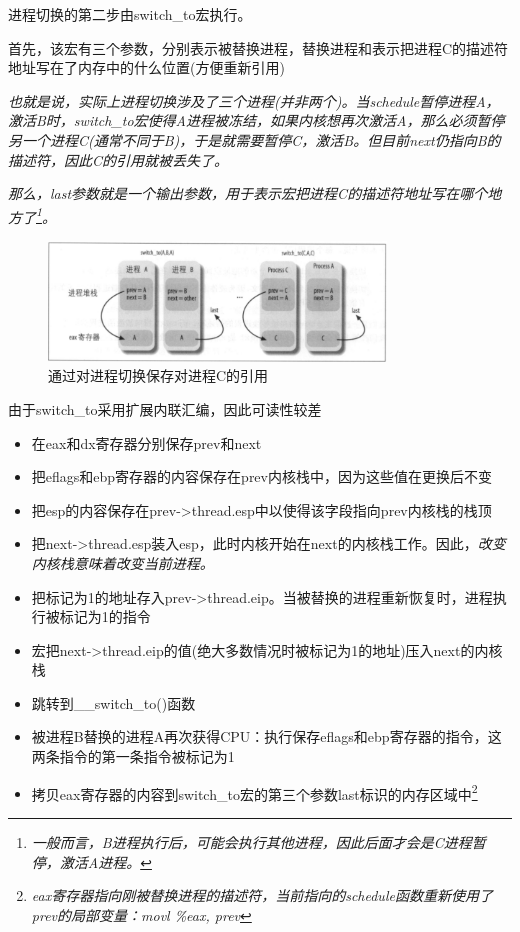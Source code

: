     进程切换的第二步由switch\_to宏执行。

    首先，该宏有三个参数，分别表示被替换进程，替换进程和表示把进程C的描述符地址写在了内存中的什么位置(方便重新引用)

    \emph{也就是说，实际上进程切换涉及了三个进程(并非两个)。当schedule暂停进程A，激活B时，switch\_to宏使得A进程被冻结，如果内核想再次激活A，那么必须暂停另一个进程C(通常不同于B)，于是就需要暂停C，激活B。但目前next仍指向B的描述符，因此C的引用就被丢失了。}

    \emph{那么，last参数就是一个输出参数，用于表示宏把进程C的描述符地址写在哪个地方了\footnote[1]{\emph{一般而言，B进程执行后，可能会执行其他进程，因此后面才会是C进程暂停，激活A进程。}}。}

\begin{figure}[!htbp]
    \centering
    \includegraphics[width=0.8\textwidth]{image/chapter03/通过对进程切换保存对进程C的引用.png}
    \caption{通过对进程切换保存对进程C的引用}
\end{figure}

    由于switch\_to采用扩展内联汇编，因此可读性较差

\begin{itemize}
    \item [1)] 在eax和dx寄存器分别保存prev和next
    \item [2)] 把eflags和ebp寄存器的内容保存在prev内核栈中，因为这些值在更换后不变
    \item [3)] 把esp的内容保存在prev->thread.esp中以使得该字段指向prev内核栈的栈顶
    \item [4)] 把next->thread.esp装入esp，此时内核开始在next的内核栈工作。因此，\emph{改变内核栈意味着改变当前进程。}
    \item [5)] 把标记为1的地址存入prev->thread.eip。当被替换的进程重新恢复时，进程执行被标记为1的指令
    \item [6)] 宏把next->thread.eip的值(绝大多数情况时被标记为1的地址)压入next的内核栈
    \item [7)] 跳转到\_\_switch\_to()函数
    \item [8)] 被进程B替换的进程A再次获得CPU：执行保存eflags和ebp寄存器的指令，这两条指令的第一条指令被标记为1
    \item [9)] 拷贝eax寄存器的内容到switch\_to宏的第三个参数last标识的内存区域中\footnote[1]{\emph{eax寄存器指向刚被替换进程的描述符，当前指向的schedule函数重新使用了prev的局部变量：movl \%eax, prev}}
\end{itemize}

